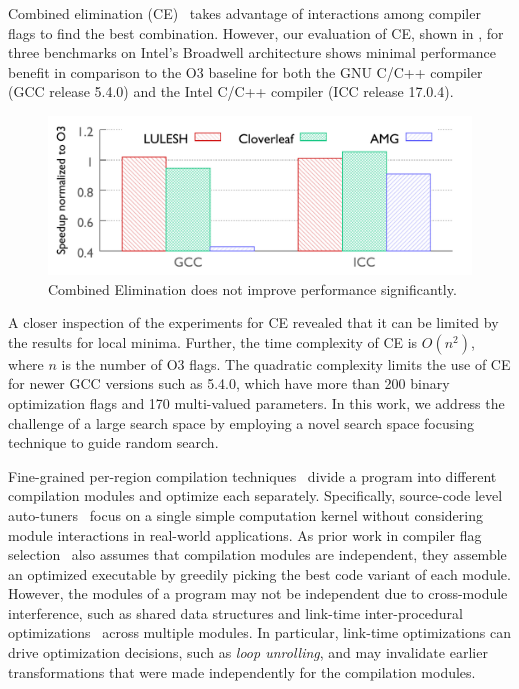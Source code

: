 Combined elimination (CE)~\cite{PanE06, Pan:2008:taco} takes advantage
of interactions among compiler flags to find the best combination.
However, our evaluation of CE, shown in , for three benchmarks on
Intel's Broadwell architecture shows minimal performance benefit in
comparison to the O3 baseline for both the GNU C/C++ compiler (GCC
release 5.4.0) and the Intel C/C++ compiler (ICC release 17.0.4).

\begin{figure}[h]
\includegraphics[width=\linewidth]{gnuplot_temp/intro.pdf}
\caption{Combined Elimination does not improve performance significantly.}
\label{fig:ce}
\end{figure}

%
A closer inspection of the experiments for CE revealed that it can
be limited by the results for local minima.  Further, the time
complexity of CE is $O(n^2)$, where $n$ is the number of O3 flags. The
quadratic complexity limits the use of CE for newer GCC versions such
as 5.4.0, which have more than 200 binary optimization flags and 170
multi-valued parameters.  In this work, we address the challenge of
a large search space by employing a novel search space focusing
technique to guide random search.

%
Fine-grained per-region compilation techniques~\cite{Pan:2008:taco,
  cere, chill, poet} divide a program into different compilation modules and
optimize each separately. 
%
Specifically, source-code level auto-tuners~\cite{chill, poet} focus
on a single simple computation kernel without considering module
interactions in real-world applications. As prior work in compiler flag
selection~\cite{Pan:2008:taco, cere} also assumes that compilation
modules are independent, they assemble an optimized executable by
greedily picking the best code variant of each module. However, the
modules of a program may not be independent due to cross-module
interference, such as shared data structures and link-time
inter-procedural optimizations~\cite{lto, lto2} across multiple
modules.  In particular, link-time optimizations can drive
optimization decisions, such as \emph{loop unrolling}, and may
invalidate earlier transformations that were made independently for
the compilation modules.


